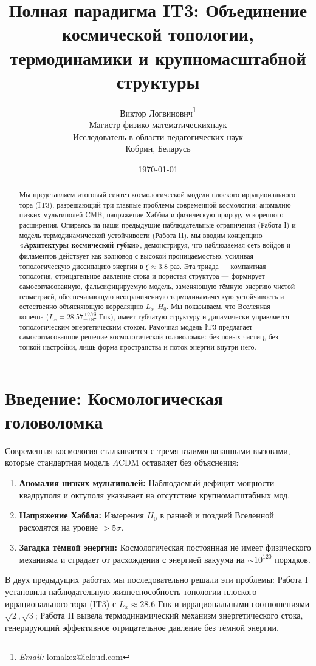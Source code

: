 \documentclass[12pt,a4paper]{article}
\title{\textbf{Полная парадигма IT3: Объединение космической топологии, термодинамики и крупномасштабной структуры}}
\author{Виктор Логвинович\thanks{\textit{Email:} lomakez@icloud.com}\\
Магистр физико-математическихнаук\\
Исследователь в области педагогических наук\\
Кобрин, Беларусь}
\date{\today}
\begin{document}
\maketitle

\begin{abstract}
Мы представляем итоговый синтез космологической модели плоского иррационального тора (IT3), разрешающий три главные проблемы современной космологии: аномалию низких мультиполей CMB, напряжение Хаббла и физическую природу ускоренного расширения. Опираясь на наши предыдущие наблюдательные ограничения (Работа I) и модель термодинамической устойчивости (Работа II), мы вводим концепцию \textbf{«Архитектуры космической губки»}, демонстрируя, что наблюдаемая сеть войдов и филаментов действует как волновод с высокой проницаемостью, усиливая топологическую диссипацию энергии в $\xi \approx 3.8$ раз. Эта триада — компактная топология, отрицательное давление стока и пористая структура — формирует самосогласованную, фальсифицируемую модель, заменяющую тёмную энергию чистой геометрией, обеспечивающую неограниченную термодинамическую устойчивость и естественно объясняющую корреляцию $L_x$--$H_0$. Мы показываем, что Вселенная конечна ($L_x = 28.57^{+0.73}_{-0.87}$ Гпк), имеет губчатую структуру и динамически управляется топологическим энергетическим стоком. Рамочная модель IT3 предлагает самосогласованное решение космологической головоломки: без новых частиц, без тонкой настройки, лишь форма пространства и поток энергии внутри него.
\end{abstract}

\section{Введение: Космологическая головоломка}

Современная космология сталкивается с тремя взаимосвязанными вызовами, которые стандартная модель $\Lambda$CDM оставляет без объяснения:
\begin{enumerate}
    \item \textbf{Аномалия низких мультиполей:} Наблюдаемый дефицит мощности квадруполя и октуполя указывает на отсутствие крупномасштабных мод.
    \item \textbf{Напряжение Хаббла:} Измерения $H_0$ в ранней и поздней Вселенной расходятся на уровне $>5\sigma$.
    \item \textbf{Загадка тёмной энергии:} Космологическая постоянная не имеет физического механизма и страдает от расхождения с энергией вакуума на $\sim 10^{120}$ порядков.
\end{enumerate}
В двух предыдущих работах мы последовательно решали эти проблемы: Работа I установила наблюдательную жизнеспособность топологии плоского иррационального тора (IT3) с $L_x \approx 28.6$ Гпк и иррациональными соотношениями $\sqrt{2}, \sqrt{3}$; Работа II вывела термодинамический механизм энергетического стока, генерирующий эффективное отрицательное давление без тёмной энергии.
\end{document}
